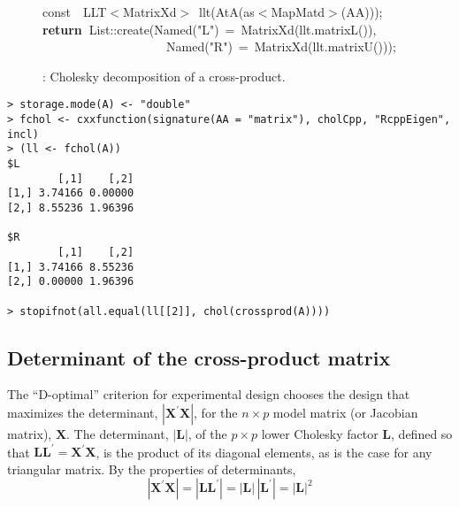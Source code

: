 \documentclass[shortnames,article]{jss}
\newcommand{\hlstd}[1]{\textcolor[rgb]{0,0,0}{#1}}
\newcommand{\hlopt}[1]{\textcolor[rgb]{0,0,0}{#1}}
\newcommand{\hlstr}[1]{\textcolor[rgb]{0.90,0.15,0.15}{#1}}
\newcommand{\hlkwa}[1]{\textcolor[rgb]{0.61,0.13,0.93}{\bf{#1}}}
\newcommand{\hlkwb}[1]{\textcolor[rgb]{0.13,0.54,0.13}{#1}}
\newcommand{\hlkwd}[1]{\textcolor[rgb]{0,0,0}{#1}}
\begin{document}
\begin{figure}[htb]
  \noindent
  \ttfamily
  \hlstd{}\hlkwb{const}\hlstd{\ \ }\hlkwb{}\hlstd{LLT}\hlopt{$<$}\hlstd{MatrixXd}\hlopt{$>$\ }\hlstd{}\hlkwd{llt}\hlstd{}\hlopt{(}\hlstd{}\hlkwd{AtA}\hlstd{}\hlopt{(}\hlstd{as}\hlopt{$<$}\hlstd{MapMatd}\hlopt{$>$(}\hlstd{AA}\hlopt{)));}\hspace*{\fill}\\
  \hlstd{}\hlkwa{return\ }\hlstd{List}\hlopt{::}\hlstd{}\hlkwd{create}\hlstd{}\hlopt{(}\hlstd{Named}\hlopt{{(}}\hlstd{}\hlstr{"L"}\hlstd{}\hlopt{{)}\ =\ }\hlstd{}\hlkwd{MatrixXd}\hlstd{}\hlopt{(}\hlstd{llt}\hlopt{.}\hlstd{}\hlkwd{matrixL}\hlstd{}\hlopt{()),}\hspace*{\fill}\\
  \hlstd{}\hlstd{\ \ \ \ \ \ \ \ \ \ \ \ \ \ \ \ \ \ \ \ }\hlstd{Named}\hlopt{{(}}\hlstd{}\hlstr{"R"}\hlstd{}\hlopt{{)}\ =\ }\hlstd{}\hlkwd{MatrixXd}\hlstd{}\hlopt{(}\hlstd{llt}\hlopt{.}\hlstd{}\hlkwd{matrixU}\hlstd{}\hlopt{()));}\hlstd{}\hspace*{\fill}\\
  \mbox{}
  \normalfont
  \normalsize
  \caption{: Cholesky decomposition of a cross-product.}
  \label{chol}
\end{figure}

\begin{verbatim}
> storage.mode(A) <- "double"
> fchol <- cxxfunction(signature(AA = "matrix"), cholCpp, "RcppEigen", incl)
> (ll <- fchol(A))
$L
        [,1]    [,2]
[1,] 3.74166 0.00000
[2,] 8.55236 1.96396

$R
        [,1]    [,2]
[1,] 3.74166 8.55236
[2,] 0.00000 1.96396

> stopifnot(all.equal(ll[[2]], chol(crossprod(A))))
\end{verbatim}



\subsection{Determinant of the cross-product matrix}
\label{sec:determinant}

The ``D-optimal'' criterion for experimental design chooses the design
that maximizes the determinant, $|\bm X^\prime\bm X|$, for the
$n\times p$ model matrix (or Jacobian matrix), $\bm X$.  The
determinant, $|\bm L|$, of the $p\times p$ lower Cholesky factor
$\bm L$, defined so that $\bm L\bm L^\prime=\bm X^\prime\bm X$, is
the product of its diagonal elements, as is the case for any
triangular matrix.  By the properties of determinants,
\begin{displaymath}
  |\bm X^\prime\bm X|=|\bm L\bm L^\prime|=|\bm L|\,|\bm L^\prime|=|\bm L|^2
\end{displaymath}
\end{document}
